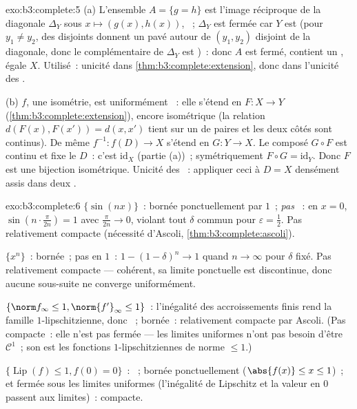 \begin{solution}{exo:b3:complete:5}
(a) L'ensemble $A = \{g = h\}$ est l'image réciproque de la
diagonale $\Delta_Y$ sous $x \mapsto (g(x), h(x))$, ~;
$\Delta_Y$ est fermée car $Y$ est  (pour $y_1 \neq
y_2$, des   disjoints donnent un pavé 
autour de $(y_1, y_2)$ disjoint de la diagonale, donc le
complémentaire de $\Delta_Y$ est )~: donc $A$ est
fermé, contient un , égale $X$. Utilisé~: unicité dans
\cref{thm:b3:complete:extension}, donc dans l'unicité des
.

(b) $f$, une isométrie, est uniformément ~: elle
s'étend en $F\colon X \to Y$
(\cref{thm:b3:complete:extension}), encore isométrique (la
relation $d(F(x), F(x')) = d(x, x')$ tient sur un  de
paires et les deux côtés sont continus). De même
$f^{-1}\colon f(D) \to X$ s'étend en $G \colon Y \to X$. Le
composé $G \circ F$ est continu et fixe le  $D$~: c'est
$\mathrm{id}_X$ (partie (a))~; symétriquement $F \circ G =
\mathrm{id}_Y$. Donc $F$ est une bijection isométrique.
Unicité des ~: appliquer ceci à $D = X$ densément
assis dans deux .
\end{solution}
\begin{solution}{exo:b3:complete:6}
$\{\sin(nx)\}$~: bornée ponctuellement par $1$~; \emph{pas}
~: en $x = 0$, $\sin(n\cdot\frac{\pi}{2n}) = 1$
avec $\frac\pi{2n} \to 0$, violant tout $\delta$ commun pour
$\varepsilon = \frac12$. Pas relativement compacte (nécessité
d'Ascoli, \cref{thm:b3:complete:ascoli}).

$\{x^n\}$~: bornée~; pas  en $1$~: $1 - (1 -
\delta)^n \to 1$ quand $n \to \infty$ pour $\delta$ fixé. Pas
relativement compacte --- cohérent, sa limite ponctuelle est
discontinue, donc aucune sous-suite ne converge uniformément.

$\{\norm f_\infty \leq 1, \norm{f'}_\infty \leq 1\}$~:
l'inégalité des accroissements finis rend la famille
$1$-lipschitzienne, donc ~; bornée~: relativement
compacte par Ascoli. (Pas compacte~: elle n'est pas fermée ---
les limites uniformes n'ont pas besoin d'être $\mathcal C^1$~;
son  est les fonctions $1$-lipschitziennes de norme
$\leq 1$.)

$\{\operatorname{Lip}(f) \leq 1, f(0) = 0\}$~: ~;
bornée ponctuellement ($\abs{f(x)} \leq x \leq 1$)~; et fermée
sous les limites uniformes (l'inégalité de Lipschitz et la
valeur en $0$ passent aux limites)~: compacte.
\end{solution}

